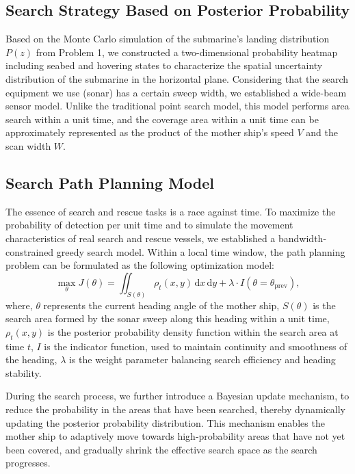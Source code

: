 \documentclass{mcmthesis}
\begin{document}
\subsection{Search Strategy Based on Posterior Probability}
Based on the Monte Carlo simulation of the submarine's landing distribution $P(z)$ from Problem 1,
we constructed a two-dimensional probability heatmap including seabed and hovering states to characterize the spatial uncertainty distribution of the submarine in the horizontal plane.
Considering that the search equipment we use (sonar) has a certain sweep width,
we established a wide-beam sensor model.
Unlike the traditional point search model, this model performs area search within a unit time,
and the coverage area within a unit time can be approximately represented as the product of the mother ship's speed $V$ and the scan width $W$.
\subsection{Search Path Planning Model}
The essence of search and rescue tasks is a race against time. To maximize the probability of detection per unit time and to simulate the movement characteristics of real search and rescue vessels,
we established a bandwidth-constrained greedy search model.
Within a local time window, the path planning problem can be formulated as the following optimization model:
\begin{equation}
  \max_{\theta} J(\theta)
  =
  \iint_{S(\theta)} \rho_t(x,y)\,\mathrm{d}x\,\mathrm{d}y
  +
  \lambda \cdot I(\theta = \theta_{\mathrm{prev}}),
\end{equation}
where,
$\theta$ represents the current heading angle of the mother ship,
$S(\theta)$ is the search area formed by the sonar sweep along this heading within a unit time,
$\rho_t(x,y)$ is the posterior probability density function within the search area at time $t$,
$I$ is the indicator function,
used to maintain continuity and smoothness of the heading,
$\lambda$ is the weight parameter balancing search efficiency and heading stability.

During the search process,
we further introduce a Bayesian update mechanism,
to reduce the probability in the areas that have been searched,
thereby dynamically updating the posterior probability distribution.
This mechanism enables the mother ship to adaptively move towards high-probability areas that have not yet been covered,
and gradually shrink the effective search space as the search progresses.
\end{document}
